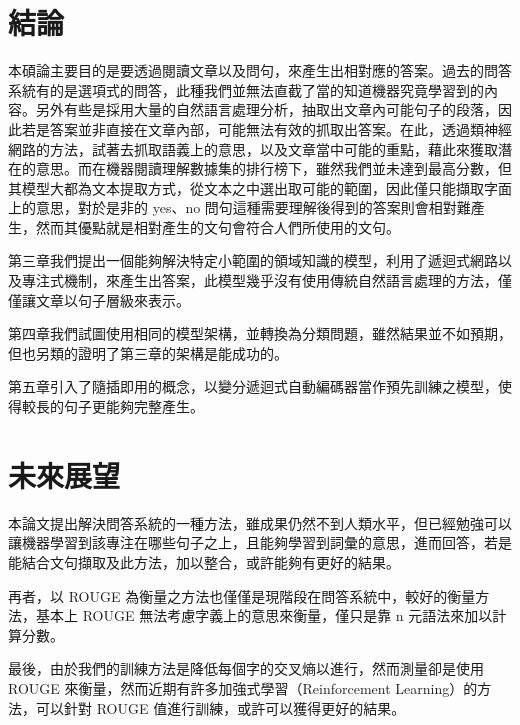 \section{結論}
本碩論主要目的是要透過閱讀文章以及問句，來產生出相對應的答案。過去的問答系統有的是選項式的問答，此種我們並無法直截了當的知道機器究竟學習到的內容。另外有些是採用大量的自然語言處理分析，抽取出文章內可能句子的段落，因此若是答案並非直接在文章內部，可能無法有效的抓取出答案。在此，透過類神經網路的方法，試著去抓取語義上的意思，以及文章當中可能的重點，藉此來獲取潛在的意思。而在機器閱讀理解數據集的排行榜下，雖然我們並未達到最高分數，但其模型大都為文本提取方式，從文本之中選出取可能的範圍，因此僅只能擷取字面上的意思，對於是非的 yes、no 問句這種需要理解後得到的答案則會相對難產生，然而其優點就是相對產生的文句會符合人們所使用的文句。

第三章我們提出一個能夠解決特定小範圍的領域知識的模型，利用了遞迴式網路以及專注式機制，來產生出答案，此模型幾乎沒有使用傳統自然語言處理的方法，僅僅讓文章以句子層級來表示。

第四章我們試圖使用相同的模型架構，並轉換為分類問題，雖然結果並不如預期，但也另類的證明了第三章的架構是能成功的。

第五章引入了隨插即用的概念，以變分遞迴式自動編碼器當作預先訓練之模型，使得較長的句子更能夠完整產生。%

\section{未來展望}
本論文提出解決問答系統的一種方法，雖成果仍然不到人類水平，但已經勉強可以讓機器學習到該專注在哪些句子之上，且能夠學習到詞彙的意思，進而回答，若是能結合文句擷取及此方法，加以整合，或許能夠有更好的結果。

再者，以 ROUGE 為衡量之方法也僅僅是現階段在問答系統中，較好的衡量方法，基本上 ROUGE 無法考慮字義上的意思來衡量，僅只是靠 n 元語法來加以計算分數。

最後，由於我們的訓練方法是降低每個字的交叉熵以進行，然而測量卻是使用 ROUGE 來衡量，然而近期有許多加強式學習（Reinforcement Learning）的方法，可以針對 ROUGE 值進行訓練，或許可以獲得更好的結果。
